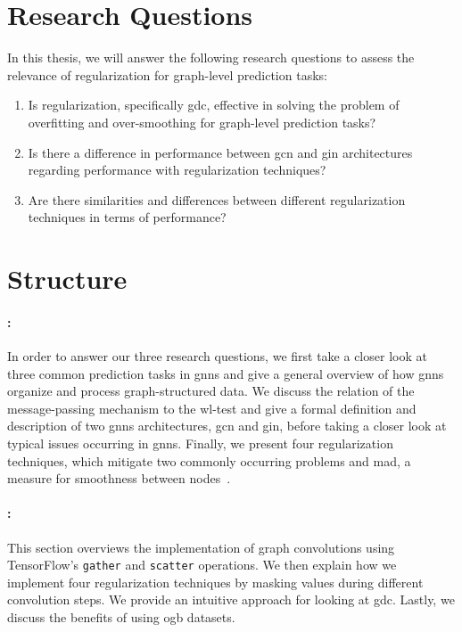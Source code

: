 \section{Research Questions}%
\label{sec:intro:questions}
In this thesis, we will answer the following research questions to assess the relevance of regularization for graph-level prediction tasks:
\begin{enumerate}
    \item Is regularization, specifically \ac{gdc}, effective in solving the problem of overfitting and over-smoothing for graph-level prediction tasks?
    \item Is there a difference in performance between \ac{gcn} and \ac{gin} architectures regarding performance with regularization techniques?
    \item Are there similarities and differences between different regularization techniques in terms of performance?
\end{enumerate}
\section{Structure}%
\label{sec:intro:structure}

\paragraph{: }
In order to answer our three research questions, we first take a closer look at three common prediction tasks in \acp{gnn}
and give a general overview of how \acp{gnn} organize and process graph-structured data.
We discuss the relation of the message-passing mechanism to the \ac{wl}-test and give a formal definition and description of two \acp{gnn} architectures, \ac{gcn} and \ac{gin}, before taking a closer look at typical issues occurring in \acp{gnn}.
Finally, we present four regularization techniques, which mitigate two commonly occurring problems and \acf{mad}, a measure for smoothness between nodes~\cite{Chen2020}.
\paragraph{: }
This section overviews the implementation of graph convolutions using TensorFlow's \texttt{gather} and \texttt{scatter} operations.
We then explain how we implement four regularization techniques by masking values during different convolution steps.
We provide an intuitive approach for looking at \ac{gdc}.
Lastly, we discuss the benefits of using \ac{ogb} datasets.
